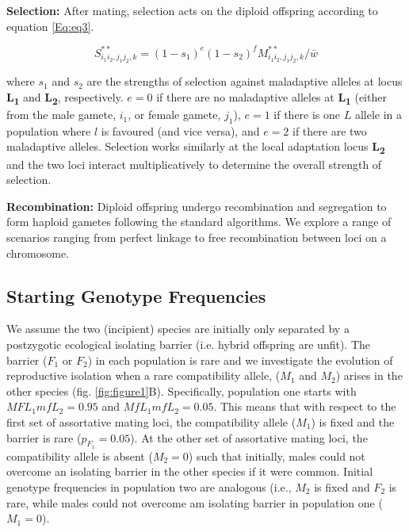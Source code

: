 \documentclass[11pt]{article}
\begin{document}
\noindent \textbf{Selection:} After mating, selection acts on the diploid offspring according to equation \ref{Eq:eq3}.

\begin{equation}\label{Eq:eq3}
S^{**}_{i_1 i_2, j_1 j_2, k} = (1 - s_1)^{e} (1 - s_2)^{f} M^{**}_{i_1 i_2, j_1 j_2, k}/\bar{w}
\end{equation}

where $s_1$ and $s_2$ are the strengths of selection against maladaptive alleles at locus \textbf{\texorpdfstring{L\textsubscript{1}}{L 1}} and \textbf{\texorpdfstring{L\textsubscript{2}}{L 2}}, respectively.  $e = 0$ if there are no maladaptive alleles at \textbf{\texorpdfstring{L\textsubscript{1}}{L 1}} (either from the male gamete, $i_1$, or female gamete, $j_1$), $e = 1$ if there is one $L$ allele in a population where $l$ is favoured (and vice versa), and $e = 2$ if there are two maladaptive alleles.  Selection works similarly at the local adaptation locus \textbf{\texorpdfstring{L\textsubscript{2}}{L 2}} and the two loci interact multiplicatively to determine the overall strength of selection.

\noindent \textbf{Recombination:} Diploid offspring undergo recombination and segregation to form haploid gametes following the standard algorithms. We explore a range of scenarios ranging from perfect linkage to free recombination between loci on a chromosome. 

\subsection*{Starting Genotype Frequencies} 

We assume the two (incipient) species are initially only separated by a postzygotic ecological isolating barrier (i.e. hybrid offspring are unfit).  The barrier ($F_1$ or $F_2$) in each population is rare and we investigate the evolution of reproductive isolation when a rare compatibility allele, ($M_1$ and $M_2$) arises in the other species (fig. \ref{fig:figure1}B).  Specifically, population one starts with $M F L_1 m f L_2 = 0.95$ and $M f L_1 m f L_2 = 0.05$. This means that with respect to the first set of assortative mating loci, the compatibility allele ($M_1$) is fixed and the barrier is rare ($p_{F_1} = 0.05$). At the other set of assortative mating loci, the compatibility allele is absent ($M_2 = 0$) such that initially, males could not overcome an isolating barrier in the other species if it were common.  Initial genotype frequencies in population two are analogous (i.e., $M_2$ is fixed and $F_2$ is rare, while males could not overcome am isolating barrier in population one ($M_1 = 0$). 
\end{document}
